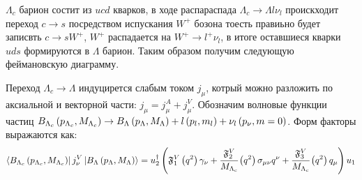 
$\Lambda_c$ барион состит из $ucd$ кварков, в ходе распараспада 
$\Lambda_c \rightarrow \Lambda l \nu_l$ проискходит переход $c\to s$ 
посредством испускания $W^+$ бозона тоесть правиьно будет записвть $c\to s W^+$,
$W^+$ распадается на $W^+ \to l^+ \nu_l$, в итоге оставшиеся кварки 
$uds$ формируются в $\Lambda$ барион. Таким образом получим следующую 
феймановскую диаграмму.

\begin{figure}[H]
    \centering
\end{figure}

Переход $\Lambda_c \to \Lambda$ индуцирется слабым током $j_\mu$, 
котрый можно разложить по аксиальной и векторной части: 
$j_\mu = j_\mu^A + j_\mu^V$.
Обозначим волновые функции частиц
$B_{\Lambda_c} \left( p_{\Lambda_c}, M_{\Lambda_c} \right) 
\to B_{\Lambda} \left( p_{\Lambda}, M_{\Lambda} \right) 
+ l\left( p_l, m_l \right) + \nu_l \left( p_\nu, m = 0 \right)$. 
Форм факторы выражаются как:
\begin{equation}
    \bra{B_{\Lambda_c} \left( p_{\Lambda_c}, M_{\Lambda_c} \right)}
    j_\nu^V
    \ket{B_{\Lambda} \left( p_{\Lambda}, M_{\Lambda} \right)} = 
    u_2^\dag \left( \mathfrak F^V_1 \left( q^2 \right) \gamma_\nu + 
    \cfrac{\mathfrak F^V_2}{M_{\Lambda_c}} \left( q^2 \right) \sigma_{\mu\nu} q^\nu + 
    \cfrac{\mathfrak F^V_3}{M_{\Lambda_c}} \left( q^2 \right)q_\mu \right) u_1 
\end{equation}

